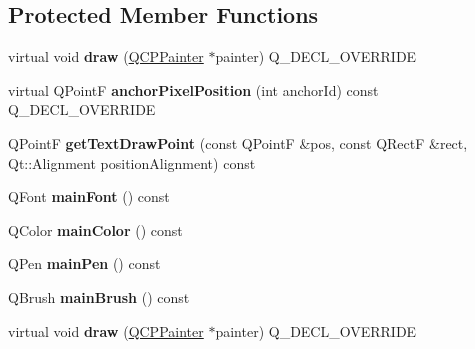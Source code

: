 \subsection*{Protected Member Functions}
\begin{DoxyCompactItemize}
\item 
virtual void {\bfseries draw} (\hyperlink{class_q_c_p_painter}{Q\+C\+P\+Painter} $\ast$painter) Q\+\_\+\+D\+E\+C\+L\+\_\+\+O\+V\+E\+R\+R\+I\+DE\hypertarget{class_q_c_p_item_text_a8f8f075da83b6547c2b32e1f64cf0554}{}\label{class_q_c_p_item_text_a8f8f075da83b6547c2b32e1f64cf0554}

\item 
virtual Q\+PointF {\bfseries anchor\+Pixel\+Position} (int anchor\+Id) const Q\+\_\+\+D\+E\+C\+L\+\_\+\+O\+V\+E\+R\+R\+I\+DE\hypertarget{class_q_c_p_item_text_afcdb1724d88d561f65da95fb54b0acb7}{}\label{class_q_c_p_item_text_afcdb1724d88d561f65da95fb54b0acb7}

\item 
Q\+PointF {\bfseries get\+Text\+Draw\+Point} (const Q\+PointF \&pos, const Q\+RectF \&rect, Qt\+::\+Alignment position\+Alignment) const \hypertarget{class_q_c_p_item_text_aa6e478b1ce198eace89157c4cacc3ddc}{}\label{class_q_c_p_item_text_aa6e478b1ce198eace89157c4cacc3ddc}

\item 
Q\+Font {\bfseries main\+Font} () const \hypertarget{class_q_c_p_item_text_a23d391bd6471c45e73f45add67ede902}{}\label{class_q_c_p_item_text_a23d391bd6471c45e73f45add67ede902}

\item 
Q\+Color {\bfseries main\+Color} () const \hypertarget{class_q_c_p_item_text_ad7bf17e4945cc86bbf9a36331da059a0}{}\label{class_q_c_p_item_text_ad7bf17e4945cc86bbf9a36331da059a0}

\item 
Q\+Pen {\bfseries main\+Pen} () const \hypertarget{class_q_c_p_item_text_a9ade32d362b22853659201c738269e2a}{}\label{class_q_c_p_item_text_a9ade32d362b22853659201c738269e2a}

\item 
Q\+Brush {\bfseries main\+Brush} () const \hypertarget{class_q_c_p_item_text_a10d6585a030633aa79d5ebc5a437f183}{}\label{class_q_c_p_item_text_a10d6585a030633aa79d5ebc5a437f183}

\item 
virtual void {\bfseries draw} (\hyperlink{class_q_c_p_painter}{Q\+C\+P\+Painter} $\ast$painter) Q\+\_\+\+D\+E\+C\+L\+\_\+\+O\+V\+E\+R\+R\+I\+DE\hypertarget{class_q_c_p_item_text_a02580ee5d7172e19a0178717edb9f79e}{}\label{class_q_c_p_item_text_a02580ee5d7172e19a0178717edb9f79e}


\end{DoxyCompactItemize}
